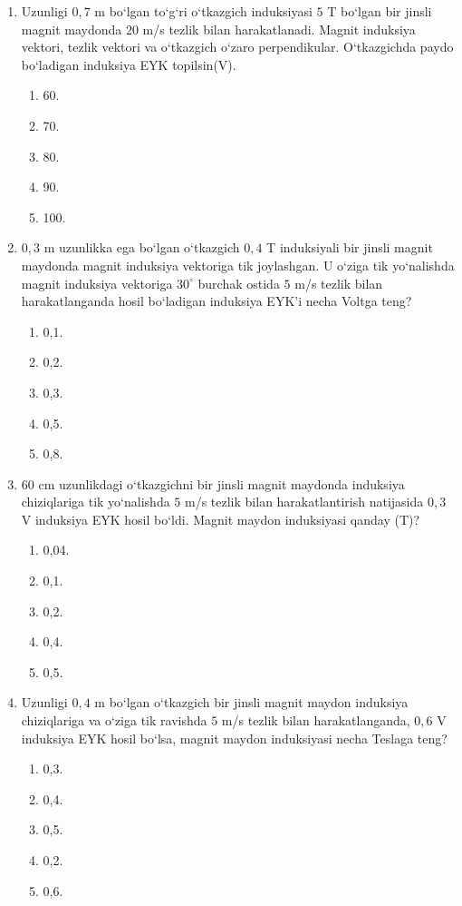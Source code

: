 \begin{enumerate}
\item Uzunligi $0,7$ m bo‘lgan to‘g‘ri o‘tkazgich induksiyasi $5$ T bo‘lgan bir jinsli magnit maydonda $20$ m/s tezlik bilan harakatlanadi. Magnit induksiya vektori, tezlik vektori va o‘tkazgich o‘zaro perpendikular. O‘tkazgichda paydo bo‘ladigan induksiya EYK topilsin(V).
\begin{enumerate}[label=\Alph*)]
\item 60.
\item 70.
\item 80.
\item 90.
\item 100.
\end{enumerate}

\item $0,3$ m uzunlikka ega bo‘lgan o‘tkazgich $0,4$ T induksiyali bir jinsli magnit maydonda magnit induksiya vektoriga tik joylashgan. U o‘ziga tik yo‘nalishda magnit induksiya vektoriga $30^\circ$ burchak ostida $5$ m/s tezlik bilan harakatlanganda hosil bo‘ladigan induksiya EYK’i necha Voltga teng?
\begin{enumerate}[label=\Alph*)]
\item 0,1.
\item 0,2.
\item 0,3.
\item 0,5.
\item 0,8.
\end{enumerate}

\item $60$ cm uzunlikdagi o‘tkazgichni bir jinsli magnit maydonda induksiya chiziqlariga tik yo‘nalishda $5$ m/s tezlik bilan harakatlantirish natijasida $0,3$ V induksiya EYK hosil bo‘ldi. Magnit maydon induksiyasi qanday (T)?
\begin{enumerate}[label=\Alph*)]
\item 0,04.
\item 0,1.
\item 0,2.
\item 0,4.
\item 0,5.
\end{enumerate}

\item Uzunligi $0,4$ m bo‘lgan o‘tkazgich bir jinsli magnit maydon induksiya chiziqlariga va o‘ziga tik ravishda $5$ m/s tezlik bilan harakatlanganda, $0,6$ V induksiya EYK hosil bo‘lsa, magnit maydon induksiyasi necha Teslaga teng?
\begin{enumerate}[label=\Alph*)]
\item 0,3.
\item 0,4.
\item 0,5.
\item 0,2.
\item 0,6.
\end{enumerate}


\end{enumerate}
